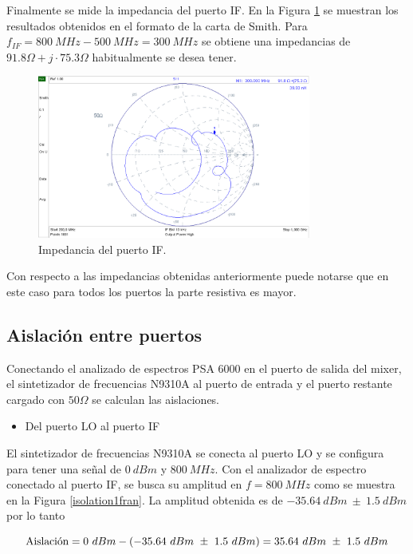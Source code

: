 \documentclass[a4paper,10pt]{article}
\begin{document}
	\indent Finalmente se mide la impedancia del puerto IF. En la Figura \ref{impedancia3fran} se muestran los resultados obtenidos en el formato de la carta de Smith. Para $f_{IF}=800~MHz-500~MHz=300~MHz$ se obtiene una impedancias de $91.8\Omega+j\cdot75.3\Omega$
	habitualmente se desea tener.
	
	\begin{figure}[!htb]
		\centering
		\includegraphics[width=9cm]{Images/impIFvieja.png}
		\caption{Impedancia del puerto IF.}
		\label{impedancia3fran}
	\end{figure}			
	Con respecto a las impedancias obtenidas anteriormente puede notarse que en este caso para todos los puertos la parte resistiva es mayor.
	
	\subsection{Aislación entre puertos}
	\indent Conectando el analizado de espectros PSA 6000 en el puerto de salida del mixer, el sintetizador de frecuencias N9310A al puerto de entrada y el puerto restante cargado con $50\Omega$ se calculan las aislaciones.
	
	\begin{itemize}
		\item Del puerto LO al puerto IF
	\end{itemize}
	
	\indent El sintetizador de frecuencias N9310A se conecta al puerto LO y se configura para tener una se\~nal de $0~dBm$ y $800~MHz$. Con el analizador de espectro conectado al puerto IF, se busca su amplitud en $f=800~MHz$ como se muestra en la Figura \ref{isolation1fran}. La amplitud obtenida es de $-35.64~dBm~\pm~1.5~dBm$ por lo tanto
	
	$$\textmd{Aislaci\'on}=0~dBm-(-35.64~dBm~\pm~1.5~dBm)=35.64~dBm~\pm~1.5~dBm$$
	
\end{document}

